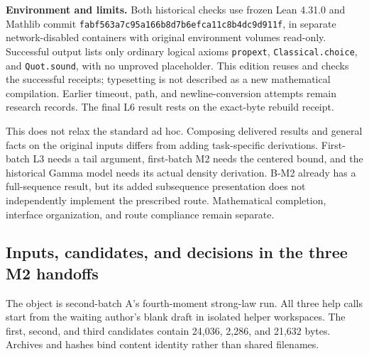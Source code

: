 \textbf{Environment and limits.} Both historical checks use frozen Lean 4.31.0 and Mathlib commit \nolinkurl{fabf563a7c95a166b8d7b6efca11c8b4dc9d911f}, in separate network-disabled containers with original environment volumes read-only. Successful output lists only ordinary logical axioms \nolinkurl{propext}, \nolinkurl{Classical.choice}, and \nolinkurl{Quot.sound}, with no unproved placeholder. This edition reuses and checks the successful receipts; typesetting is not described as a new mathematical compilation. Earlier timeout, path, and newline-conversion attempts remain research records. The final L6 result rests on the exact-byte rebuild receipt.

This does not relax the standard ad hoc. Composing delivered results and general facts on the original inputs differs from adding task-specific derivations. First-batch L3 needs a tail argument, first-batch M2 needs the centered bound, and the historical Gamma model needs its actual density derivation. B-M2 already has a full-sequence result, but its added subsequence presentation does not independently implement the prescribed route. Mathematical completion, interface organization, and route compliance remain separate.

\subsection[Inputs, candidates, and decisions in the three M2 handoffs]{\texorpdfstring{\protect\hypertarget{u3}{}Inputs, candidates, and decisions in the three M2 handoffs}{Inputs, candidates, and decisions in the three M2 handoffs}}
The object is second-batch A's fourth-moment strong-law run. All three help calls start from the waiting author's blank draft in isolated helper workspaces. The first, second, and third candidates contain 24,036, 2,286, and 21,632 bytes. Archives and hashes bind content identity rather than shared filenames.

